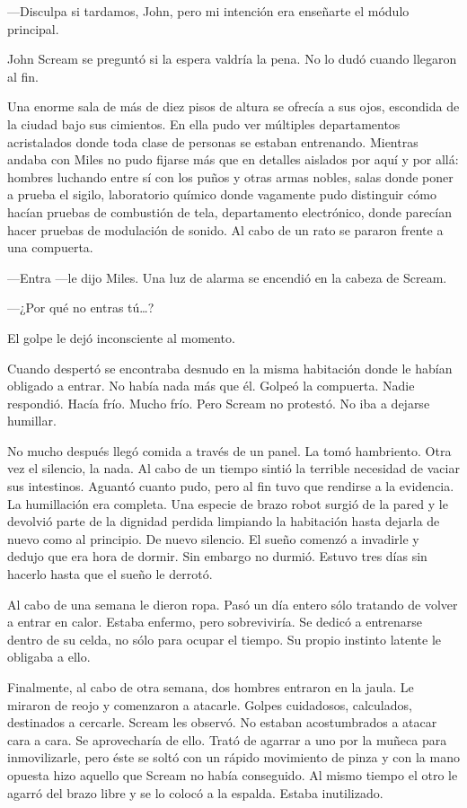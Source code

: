 ---Disculpa si tardamos, John, pero mi intención era enseñarte el módulo principal.

John Scream se preguntó si la espera valdría la pena. No lo dudó cuando llegaron al fin.

Una enorme sala de más de diez pisos de altura se ofrecía a sus ojos, escondida de la ciudad bajo sus cimientos. En ella pudo ver múltiples departamentos acristalados donde toda clase de personas se estaban entrenando. Mientras andaba con Miles no pudo fijarse más que en detalles aislados por aquí y por allá: hombres luchando entre sí con los puños y otras armas nobles, salas donde poner a prueba el sigilo, laboratorio químico donde vagamente pudo distinguir cómo hacían pruebas de combustión de tela, departamento electrónico, donde parecían hacer pruebas de modulación de sonido. Al cabo de un rato se pararon frente a una compuerta.

---Entra ---le dijo Miles. Una luz de alarma se encendió en la cabeza de Scream.

---¿Por qué no entras tú\dots{}?

El golpe le dejó inconsciente al momento.

Cuando despertó se encontraba desnudo en la misma habitación donde le habían obligado a entrar. No había nada más que él. Golpeó la compuerta. Nadie respondió. Hacía frío. Mucho frío. Pero Scream no protestó. No iba a dejarse humillar.

No mucho después llegó comida a través de un panel. La tomó hambriento. Otra vez el silencio, la nada. Al cabo de un tiempo sintió la terrible necesidad de vaciar sus intestinos. Aguantó cuanto pudo, pero al fin tuvo que rendirse a la evidencia. La humillación era completa. Una especie de brazo robot surgió de la pared y le devolvió parte de la dignidad perdida limpiando la habitación hasta dejarla de nuevo como al principio. De nuevo silencio. El sueño comenzó a invadirle y dedujo que era hora de dormir. Sin embargo no durmió. Estuvo tres días sin hacerlo hasta que el sueño le derrotó.

Al cabo de una semana le dieron ropa. Pasó un día entero sólo tratando de volver a entrar en calor. Estaba enfermo, pero sobreviviría. Se dedicó a entrenarse dentro de su celda, no sólo para ocupar el tiempo. Su propio instinto latente le obligaba a ello.

Finalmente, al cabo de otra semana, dos hombres entraron en la jaula. Le miraron de reojo y comenzaron a atacarle. Golpes cuidadosos, calculados, destinados a cercarle. Scream les observó. No estaban acostumbrados a atacar cara a cara. Se aprovecharía de ello. Trató de agarrar a uno por la muñeca para inmovilizarle, pero éste se soltó con un rápido movimiento de pinza y con la mano opuesta hizo aquello que Scream no había conseguido. Al mismo tiempo el otro le agarró del brazo libre y se lo colocó a la espalda. Estaba inutilizado.

